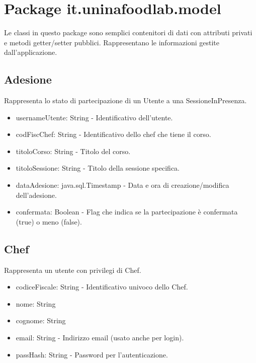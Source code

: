 \documentclass[a4paper, 12pt]{article}
\begin{document}
\section{Package it.uninafoodlab.model}
Le classi in questo package sono semplici contenitori di dati con attributi privati e metodi getter/setter pubblici. Rappresentano le informazioni gestite dall'applicazione.

\subsection{Adesione}
Rappresenta lo stato di partecipazione di un Utente a una SessioneInPresenza.
\begin{itemize}
    \item usernameUtente: String - Identificativo dell'utente.
    \item codFiscChef: String - Identificativo dello chef che tiene il corso.
    \item titoloCorso: String - Titolo del corso.
    \item titoloSessione: String - Titolo della sessione specifica.
    \item dataAdesione: java.sql.Timestamp - Data e ora di creazione/modifica dell'adesione.
    \item confermata: Boolean - Flag che indica se la partecipazione è confermata (true) o meno (false).
\end{itemize}

\subsection{Chef}
Rappresenta un utente con privilegi di Chef.
\begin{itemize}
    \item codiceFiscale: String - Identificativo univoco dello Chef.
    \item nome: String
    \item cognome: String
    \item email: String - Indirizzo email (usato anche per login).
    \item passHash: String - Password per l'autenticazione.
\end{itemize}
\end{document}
